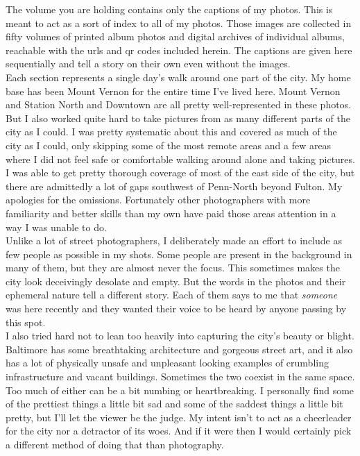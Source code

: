 \documentclass[10pt,letterpaper]{article}
\begin{document}
The volume you are holding contains only the captions of my photos.  This is meant to act as a sort of index to all of my photos.  Those images are collected in fifty volumes of printed album photos and digital archives of individual albums, reachable with the urls and qr codes included herein.  The captions are given here sequentially and tell a story on their own even without the images.\\


Each section represents a single day's walk around one part of the city.  My home base has been Mount Vernon for the entire time I've lived here.  Mount Vernon and Station North and Downtown are all pretty well-represented in these photos.  But I also worked quite hard to take pictures from as many different parts of the city as I could.  I was pretty systematic about this and covered as much of the city as I could, only skipping some of the most remote areas and a few areas where I did not feel safe or comfortable walking around alone and taking pictures.  I was able to get pretty thorough coverage of most of the east side of the city, but there are admittedly a lot of gaps southwest of Penn-North beyond Fulton.  My apologies for the omissions.  Fortunately other photographers with more familiarity and better skills than my own have paid those areas attention in a way I was unable to do.\\


Unlike a lot of street photographers, I deliberately made an effort to include as few people as possible in my shots.  Some people are present in the background in many of them, but they are almost never the focus.  This sometimes makes the city look deceivingly desolate and empty.  But the words in the photos and their ephemeral nature tell a different story.  Each of them says to me that \textit{someone} was here recently and they wanted their voice to be heard by anyone passing by this spot.\\


I also tried hard not to lean too heavily into capturing the city's beauty or blight.  Baltimore has some breathtaking architecture and gorgeous street art, and it also has a lot of physically unsafe and unpleasant looking examples of crumbling infrastructure and vacant buildings.  Sometimes the two coexist in the same space. Too much of either can be a bit numbing or heartbreaking.  I personally find some of the prettiest things a little bit sad and some of the saddest things a little bit pretty, but I'll let the viewer be the judge.  My intent isn't to act as a cheerleader for the city nor a detractor of its woes.  And if it were then I would certainly pick a different method of doing that than photography.\\
\end{document}

